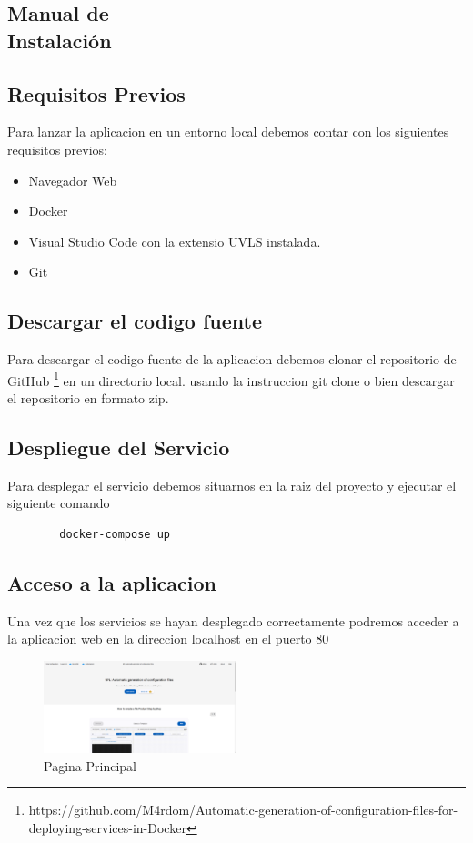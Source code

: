\documentclass[12pt, a4paper, twoside]{article}
\begin{document}
\begin{umaappendices}
    \section{Manual de \\ Instalación}
	\label{sec:Manual de Instalación}
	\subsection{Requisitos Previos}
	Para lanzar la aplicacion en un entorno local debemos contar con los siguientes requisitos previos:
	\begin{itemize}
		\item Navegador Web
		\item Docker
		\item Visual Studio Code con la extensio UVLS \cite{uvls_code} instalada.
		\item Git
	\end{itemize}

	\subsection{Descargar el codigo fuente}
	Para descargar el codigo fuente de la aplicacion debemos clonar el repositorio de GitHub \cite{m4rdom_project_repository} \footnote{https://github.com/M4rdom/Automatic-generation-of-configuration-files-for-deploying-services-in-Docker} en un directorio local.
	usando la instruccion git clone o bien descargar el repositorio en formato zip.
	\subsection{Despliegue del Servicio}
	Para desplegar el servicio debemos situarnos en la raiz del proyecto y ejecutar el siguiente comando
	\begin{verbatim}
		docker-compose up
	\end{verbatim}
	\subsection{Acceso a la aplicacion}
	Una vez que los servicios se hayan desplegado correctamente podremos acceder a la aplicacion web en la direccion localhost en el puerto 80
	\begin{figure}[ht]
		\centering
			\includegraphics[width=0.5\textwidth]{frontpage.png}
		\caption{Pagina Principal}
	\end{figure}

\end{umaappendices}
\end{document}
